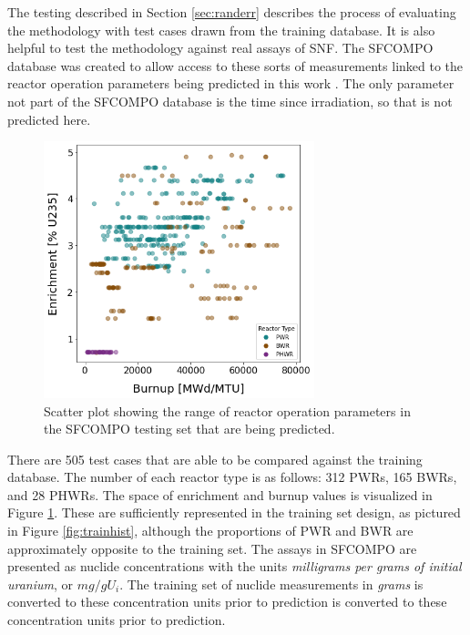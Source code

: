 
The testing described in Section \ref{sec:randerr} describes the process of
evaluating the methodology with test cases drawn from the training database.
It is also helpful to test the methodology against real assays of \gls{SNF}.
The \gls{SFCOMPO} database was created to allow access to these sorts of
measurements linked to the reactor operation parameters being predicted in this
work \cite{sfcompo, valid_sfco}. The only parameter not part of the
\gls{SFCOMPO} database is the time since irradiation, so that is not predicted
here. 

\begin{figure}[!htb]
  \centering
  \includegraphics[width=0.7\textwidth]{./chapters/exp1/sfcompo_scatter_viz.png}
  \caption{Scatter plot showing the range of reactor operation parameters in 
           the \gls{SFCOMPO} testing set that are being predicted.}
  \label{fig:sfcoscatter}
\end{figure}

There are 505 test cases that are able to be compared against the training
database.  The number of each reactor type is as follows: 312 \gls{PWR}s, 165
\gls{BWR}s, and 28 \gls{PHWR}s. The space of enrichment and burnup values is
visualized in Figure \ref{fig:sfcoscatter}. These are sufficiently represented
in the training set design, as pictured in Figure \ref{fig:trainhist}, although
the proportions of \gls{PWR} and \gls{BWR} are approximately opposite to the
training set. The assays in \gls{SFCOMPO} are presented as nuclide
concentrations with the units \textit{milligrams per grams of initial uranium},
or $mg/gU_i$. The training set of nuclide measurements in \textit{grams} is
converted to these concentration units prior to prediction is converted to
these concentration units prior to prediction. 

